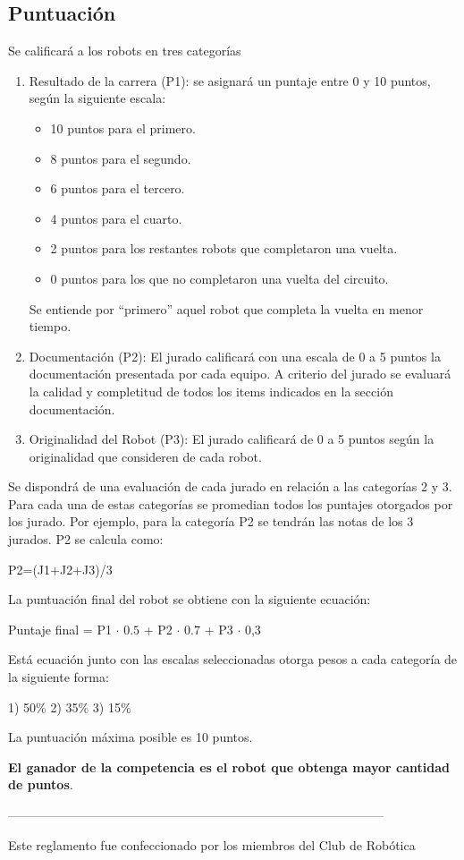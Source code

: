 \documentclass[a4paper,11pt]{article}
\begin{document}
\subsection*{Puntuación}
Se calificará a los robots en tres categorías
\begin{enumerate}
  \item Resultado de la carrera (P1): se asignará un puntaje entre 0 y 10 puntos, según la siguiente escala:
  \begin{itemize}
    \item 10 puntos para el primero.
    \item  8 puntos para el segundo.
    \item  6 puntos para el tercero.
    \item  4 puntos para el cuarto.
    \item  2 puntos para los restantes robots que completaron una vuelta.
    \item  0 puntos para los que no completaron una vuelta del circuito.
  \end{itemize}    
    Se entiende por ``primero'' aquel robot que completa la vuelta en menor tiempo.

  \item Documentación (P2): El jurado calificará con una escala de 0 a 5 puntos la documentación presentada por cada equipo.
  A criterio del jurado se evaluará la calidad y completitud de todos los items indicados en la sección documentación.

  \item Originalidad del Robot (P3): El jurado calificará de 0 a 5 puntos según la originalidad que consideren de cada robot.
\end{enumerate}

Se dispondrá de una evaluación de cada jurado en relación a las categorías 2 y 3. Para cada una de estas categorías se promedian todos los puntajes otorgados por los jurado. Por ejemplo, para la categoría P2 se tendrán las notas de los 3 jurados. P2 se calcula como:

\begin{center}
P2=(J1+J2+J3)/3
\end{center}

La puntuación final del robot se obtiene con la siguiente ecuación:

\begin{center}
Puntaje final = P1 $\cdot$ $0.5$ + P2 $\cdot$ $0.7$ + P3 $\cdot$ 0,3
\end{center}

Está ecuación junto con las escalas seleccionadas otorga pesos a cada categoría de la siguiente forma:

1) 50\%  2) 35\%  3) 15\%

La puntuación máxima posible es 10 puntos.

\textbf{El ganador de la competencia es el robot que obtenga mayor cantidad de puntos}.

------------------------------------------------------------------------------------------

Este reglamento fue confeccionado por los miembros del Club de Robótica
\end{document}
